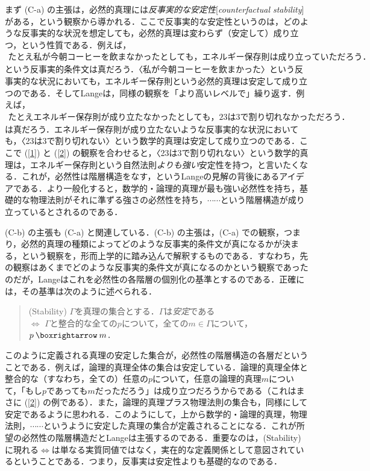\documentclass[dvipdfmx,twoside,11pt,uplatex]{jsarticle}
\newcommand{\myterm}[2]{{\emph{#1}}{[\emph{#2}]}}
\theoremstyle{definition}
\begin{document}
まず (C-a) の主張は，必然的真理には\myterm{反事実的な安定性}{counterfactual stability}がある，という観察から導かれる．ここで反事実的な安定性というのは，どのような反事実的な状況を想定しても，必然的真理は変わらず（安定して）成り立つ，という性質である．例えば，
\begin{align}
    たとえ私が今朝コーヒーを飲まなかったとしても，エネルギー保存則は成り立っていただろう．\label{1}
\end{align}
という反事実的条件文は真だろう．〈私が今朝コーヒーを飲まかった〉という反事実的な状況においても，エネルギー保存則という必然的真理は安定して成り立つのである．そしてLangeは，同様の観察を「より高いレベルで」繰り返す．例えば，
\begin{align}
    たとえエネルギー保存則が成り立たなかったとしても，23は3で割り切れなかっただろう．\label{2}
\end{align}
は真だろう．エネルギー保存則が成り立たないような反事実的な状況においても，〈23は3で割り切れない〉という数学的真理は安定して成り立つのである．ここで (\ref{1}) と (\ref{2}) の観察を合わせると，〈23は3で割り切れない〉という数学的真理は，エネルギー保存則という自然法則\emph{よりも強い}安定性を持つ，と言いたくなる．これが，必然性は階層構造をなす，というLangeの見解の背後にあるアイデアである．より一般化すると，数学的・論理的真理が最も強い必然性を持ち，基礎的な物理法則がそれに準ずる強さの必然性を持ち，$\cdots\cdots$という階層構造が成り立っているとされるのである．

(C-b) の主張も (C-a) と関連している．(C-b) の主張は，(C-a) での観察，つまり，必然的真理の種類によってどのような反事実的条件文が真になるかが決まる，という観察を，形而上学的に踏み込んで解釈するものである．すなわち，先の観察はあくまでどのような反事実的条件文が真になるのかという観察であったのだが，Langeはこれを必然性の各階層の個別化の基準とするのである．正確には，その基準は次のように述べられる\citep[29]{lange2009lawmakers}．
\begin{quote}
    (Stability)\quad 
    $\Gamma$を真理の集合とする．$\Gamma$は\emph{安定}である\\
    $\Longleftrightarrow$ $\Gamma$と整合的な全ての$p$について，全ての$m\in\Gamma$について，$p\necif m$．
\end{quote}
このように定義される真理の安定した集合が，必然性の階層構造の各層だということである．例えば，論理的真理全体の集合は安定している．論理的真理全体と整合的な（すなわち，全ての）任意の$p$について，任意の論理的真理$m$について，「もし$p$であっても$m$だっただろう」は成り立つだろうからである（これはまさに (\ref{2}) の例である）．また，論理的真理プラス物理法則の集合も，同様にして安定であるように思われる．このようにして，上から数学的・論理的真理，物理法則，$\cdots\cdots$というように安定した真理の集合が定義されることになる．これが所望の必然性の階層構造だとLangeは主張するのである．重要なのは，(Stability)に現れる$\Leftrightarrow$は単なる実質同値ではなく，実在的な定義関係として意図されているということである．つまり，反事実は安定性よりも基礎的なのである．
\end{document}

